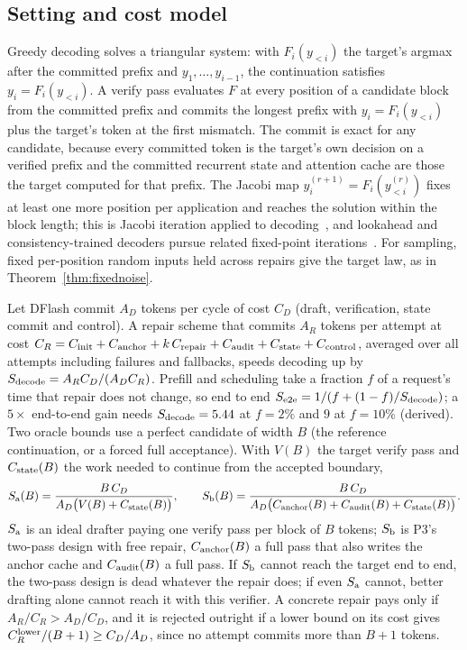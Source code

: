 \subsection{Setting and cost model}\label{sec:repair-model}
Greedy decoding solves a triangular system: with $F_i(y_{<i})$ the target's argmax after the committed prefix and $y_1,\dots,y_{i-1}$, the continuation satisfies $y_i=F_i(y_{<i})$. A verify pass evaluates $F$ at every position of a candidate block from the committed prefix and commits the longest prefix with $y_i=F_i(y_{<i})$ plus the target's token at the first mismatch. The commit is exact for any candidate, because every committed token is the target's own decision on a verified prefix and the committed recurrent state and attention cache are those the target computed for that prefix. The Jacobi map $y^{(r+1)}_i=F_i(y^{(r)}_{<i})$ fixes at least one more position per application and reaches the solution within the block length; this is Jacobi iteration applied to decoding~\cite{song2021parallel,santilli2023jacobi}, and lookahead and consistency-trained decoders pursue related fixed-point iterations~\cite{lookahead,cllm}.
For sampling, fixed per-position random inputs held across repairs give the target law, as in Theorem~\ref{thm:fixednoise}.

Let DFlash commit $A_D$ tokens per cycle of cost $C_D$ (draft, verification, state commit and control). A repair scheme that commits $A_R$ tokens per attempt at cost $C_R=C_{\rm init}+C_{\rm anchor}+k\,C_{\rm repair}+C_{\rm audit}+C_{\rm state}+C_{\rm control}$, averaged over all attempts including failures and fallbacks, speeds decoding up by $S_{\rm decode}=A_RC_D/(A_DC_R)$. Prefill and scheduling take a fraction $f$ of a request's time that repair does not change, so end to end $S_{\rm e2e}=1/(f+(1-f)/S_{\rm decode})$; a $5\times$ end-to-end gain needs $S_{\rm decode}=5.44$ at $f=2\%$ and $9$ at $f=10\%$ (derived). Two oracle bounds use a perfect candidate of width $B$ (the reference continuation, or a forced full acceptance). With $V(B)$ the target verify pass and $C_{\rm state}(B)$ the work needed to continue from the accepted boundary,
\begin{equation}\label{eq:repair-oracle}
S_{\rm a}(B)=\frac{B\,C_D}{A_D\bigl(V(B)+C_{\rm state}(B)\bigr)},\qquad
S_{\rm b}(B)=\frac{B\,C_D}{A_D\bigl(C_{\rm anchor}(B)+C_{\rm audit}(B)+C_{\rm state}(B)\bigr)}.
\end{equation}
$S_{\rm a}$ is an ideal drafter paying one verify pass per block of $B$ tokens; $S_{\rm b}$ is P3's two-pass design with free repair, $C_{\rm anchor}(B)$ a full pass that also writes the anchor cache and $C_{\rm audit}(B)$ a full pass. If $S_{\rm b}$ cannot reach the target end to end, the two-pass design is dead whatever the repair does; if even $S_{\rm a}$ cannot, better drafting alone cannot reach it with this verifier. A concrete repair pays only if $A_R/C_R>A_D/C_D$, and it is rejected outright if a lower bound on its cost gives $C_R^{\rm lower}/(B+1)\ge C_D/A_D$, since no attempt commits more than $B+1$ tokens.

